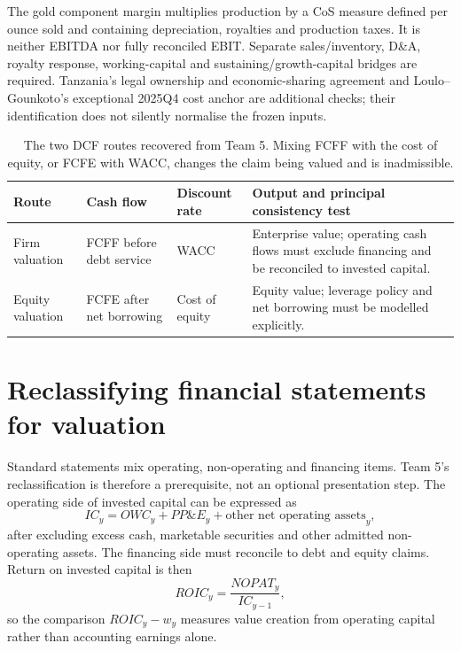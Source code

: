 The gold component margin multiplies production by a CoS measure defined per
ounce sold and containing depreciation, royalties and production taxes.
It is neither EBITDA nor fully reconciled EBIT. Separate sales/inventory,
D\&A, royalty response, working-capital and sustaining/growth-capital bridges
are required. Tanzania's legal ownership and economic-sharing agreement and
Loulo--Gounkoto's exceptional 2025Q4 cost anchor are additional checks;
their identification does not silently normalise the frozen inputs.

\begin{table}[H]
\centering
\small
\begin{tabularx}{\textwidth}{@{}p{2.7cm}p{3.0cm}p{2.8cm}X@{}}
\toprule
Route & Cash flow & Discount rate & Output and principal consistency test \\
\midrule
Firm valuation & FCFF before debt service & WACC & Enterprise value; operating
cash flows must exclude financing and be reconciled to invested capital. \\
Equity valuation & FCFE after net borrowing & Cost of equity & Equity value;
leverage policy and net borrowing must be modelled explicitly. \\
\bottomrule
\end{tabularx}
\caption{The two DCF routes recovered from Team 5. Mixing FCFF with the cost of
equity, or FCFE with WACC, changes the claim being valued and is inadmissible.}
\label{tab:dcf-route-consistency}
\end{table}

\section{Reclassifying financial statements for valuation}

Standard statements mix operating, non-operating and financing items. Team 5's
reclassification is therefore a prerequisite, not an optional presentation
step. The operating side of invested capital can be expressed as
\begin{equation}
IC_y=OWC_y+PP\&E_y+\text{other net operating assets}_y,
\end{equation}
after excluding excess cash, marketable securities and other admitted
non-operating assets. The financing side must reconcile to debt and equity
claims. Return on invested capital is then
\begin{equation}
ROIC_y=\frac{NOPAT_y}{IC_{y-1}},
\end{equation}
so the comparison \(ROIC_y-w_y\) measures value creation from operating
capital rather than accounting earnings alone.


